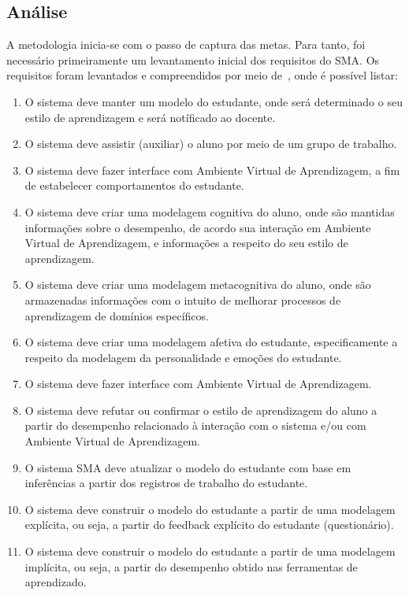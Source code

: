 \subsection{Análise}\label{subsection:analise}

A metodologia inicia-se com o passo de captura das metas. Para tanto, foi necessário primeiramente um levantamento inicial dos requisitos do SMA. Os requisitos foram levantados e compreendidos por meio de~\cite{editalFrank}, onde é possível listar:

\begin{enumerate}
	\item O sistema deve manter um modelo do estudante, onde será determinado o seu estilo de aprendizagem e será notíficado ao docente.
	\item O sistema deve assistir (auxiliar) o aluno por meio de um grupo de trabalho.
	\item O sistema deve fazer interface com Ambiente Virtual de Aprendizagem, a fim de estabelecer comportamentos do estudante.
	\item O sistema deve criar uma modelagem cognitiva do aluno, onde são mantidas informações sobre o desempenho, de acordo sua interação em Ambiente Virtual de Aprendizagem, e informações a respeito do seu estilo de aprendizagem.
	\item O sistema deve criar uma modelagem metacognitiva do aluno, onde são armazenadas informações com o intuito de melhorar processos de aprendizagem de domínios específicos.
	\item O sistema deve criar uma modelagem afetiva do estudante, especificamente a respeito da modelagem da personalidade e emoções do estudante.
	\item O sistema deve fazer interface com Ambiente Virtual de Aprendizagem.
	\item O sistema deve refutar ou confirmar o estilo de aprendizagem do aluno a partir do desempenho relacionado à interação com o sistema e/ou com Ambiente Virtual de Aprendizagem.
	\item O sistema SMA deve atualizar o modelo do estudante com base em inferências a partir dos registros de trabalho do estudante.
	\item O sistema deve construir o modelo do estudante a partir de uma modelagem explícita, ou seja, a partir do feedback explícito do estudante (questionário).
	\item O sistema deve construir o modelo do estudante a partir de uma modelagem implícita, ou seja, a partir do desempenho obtido nas ferramentas de aprendizado.
\end{enumerate}

